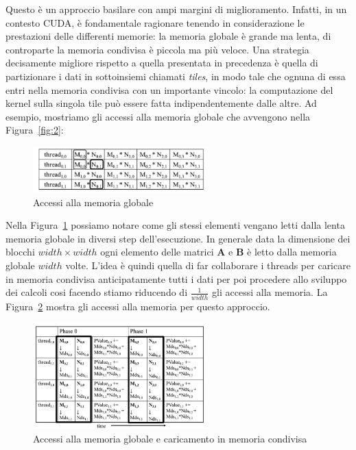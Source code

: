 \documentclass[a4paper]{article}
\begin{document}
Questo è un approccio basilare con ampi margini di miglioramento. Infatti, in un contesto CUDA, è fondamentale ragionare tenendo in considerazione le prestazioni delle differenti memorie: la memoria globale è grande ma lenta, di controparte la memoria condivisa è piccola ma più veloce. Una strategia decisamente migliore rispetto a quella presentata in precedenza è quella di partizionare i dati in sottoinsiemi chiamati \textit{tiles}, in modo tale che ognuna di essa entri nella memoria condivisa con un importante vincolo: la computazione del kernel sulla singola tile può essere fatta indipendentemente dalle altre. Ad esempio, mostriamo gli accessi alla memoria globale che avvengono nella Figura~\ref{fig:2}:

\begin{figure}[H]
    \centering
    \includegraphics[width=0.6\textwidth]{imgs/memory_access.png}
    \caption{Accessi alla memoria globale}
    \label{fig:3}
\end{figure}

Nella Figura~\ref{fig:3} possiamo notare come gli stessi elementi vengano letti dalla lenta memoria globale in diversi step dell'esecuzione. In generale data la dimensione dei blocchi $width\times{width}$ ogni elemento delle matrici $\mathbf{A}$ e $\mathbf{B}$ è letto dalla memoria globale $width$ volte. L'idea è quindi quella di far collaborare i threads per caricare in memoria condivisa anticipatamente tutti i dati per poi procedere allo sviluppo dei calcoli cosi facendo stiamo riducendo di $\frac{1}{width}$ gli accessi alla memoria. La Figura~\ref{fig:4} mostra gli accessi alla memoria per questo approccio.

\begin{figure}[H]
    \centering
    \includegraphics[width=0.6\textwidth]{imgs/memory_access1.png}
    \caption{Accessi alla memoria globale e caricamento in memoria condivisa}
    \label{fig:4}
\end{figure}
\end{document}
